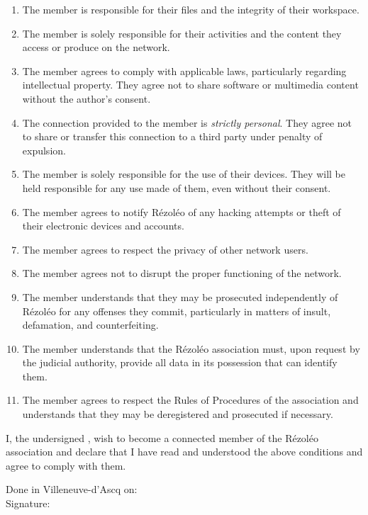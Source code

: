 \documentclass[11pt, a4paper]{article}
\begin{document}
\begin{enumerate}

\item The member is responsible for their files and the integrity of their workspace.

\item The member is solely responsible for their activities and the content they access or produce on the network.

\item The member agrees to comply with applicable laws, particularly regarding intellectual property. They agree not to share software or multimedia content without the author's consent.

\item The connection provided to the member is \textit{strictly personal}. They agree not to share or transfer this connection to a third party under penalty of expulsion.

\item The member is solely responsible for the use of their devices. They will be held responsible for any use made of them, even without their consent.

\item The member agrees to notify Rézoléo of any hacking attempts or theft of their electronic devices and accounts.

\item The member agrees to respect the privacy of other network users.

\item The member agrees not to disrupt the proper functioning of the network.

\item The member understands that they may be prosecuted independently of Rézoléo for any offenses they commit, particularly in matters of insult, defamation, and counterfeiting.

\item The member understands that the Rézoléo association must, upon request by the judicial authority, provide all data in its possession that can identify them.

\item The member agrees to respect the Rules of Procedures of the association and understands that they may be deregistered and prosecuted if necessary.

\end{enumerate}

\vspace*{0.5cm}

\noindent I, the undersigned \makebox[75mm]{\dotfill}, wish to become a connected member of the Rézoléo association and declare that I have read and understood the above conditions and agree to comply with them.

\begin{flushright}
	\begin{minipage}{0.5\linewidth}
		Done in Villeneuve-d'Ascq on: \dotfill\\
		Signature:
	\end{minipage}
\end{flushright}
\end{document}
